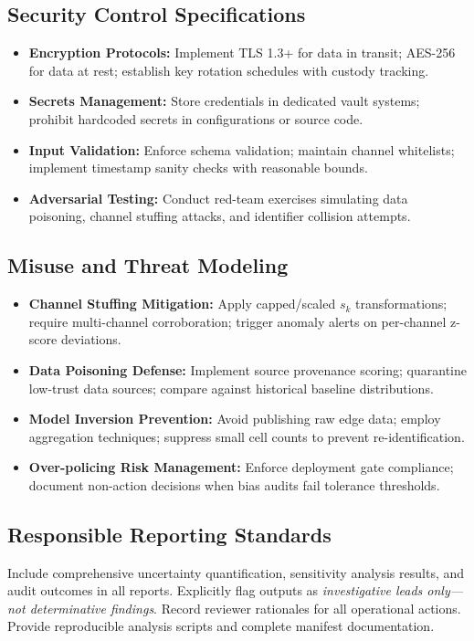 \documentclass[12pt]{article}
\theoremstyle{plain}
\begin{document}
\subsection{Security Control Specifications}
\begin{itemize}\itemsep0.2em
\item \textbf{Encryption Protocols:} Implement TLS 1.3+ for data in transit; AES-256 for data at rest; establish key rotation schedules with custody tracking.
\item \textbf{Secrets Management:} Store credentials in dedicated vault systems; prohibit hardcoded secrets in configurations or source code.
\item \textbf{Input Validation:} Enforce schema validation; maintain channel whitelists; implement timestamp sanity checks with reasonable bounds.
\item \textbf{Adversarial Testing:} Conduct red-team exercises simulating data poisoning, channel stuffing attacks, and identifier collision attempts.
\end{itemize}

\subsection{Misuse and Threat Modeling}
\begin{itemize}\itemsep0.2em
\item \textbf{Channel Stuffing Mitigation:} Apply capped/scaled $s_k$ transformations; require multi-channel corroboration; trigger anomaly alerts on per-channel z-score deviations.
\item \textbf{Data Poisoning Defense:} Implement source provenance scoring; quarantine low-trust data sources; compare against historical baseline distributions.
\item \textbf{Model Inversion Prevention:} Avoid publishing raw edge data; employ aggregation techniques; suppress small cell counts to prevent re-identification.
\item \textbf{Over-policing Risk Management:} Enforce deployment gate compliance; document non-action decisions when bias audits fail tolerance thresholds.
\end{itemize}

\subsection{Responsible Reporting Standards}
Include comprehensive uncertainty quantification, sensitivity analysis results, and audit outcomes in all reports. Explicitly flag outputs as \emph{investigative leads only—not determinative findings}. Record reviewer rationales for all operational actions. Provide reproducible analysis scripts and complete manifest documentation.
\end{document}
